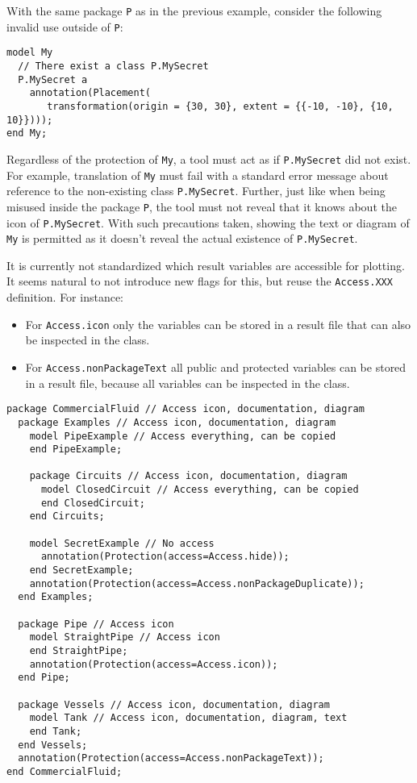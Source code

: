 \begin{example}
With the same package \lstinline!P! as in the previous example, consider the following invalid use outside of \lstinline!P!:
\begin{lstlisting}[language=modelica]
model My
  // There exist a class P.MySecret
  P.MySecret a
    annotation(Placement(
       transformation(origin = {30, 30}, extent = {{-10, -10}, {10, 10}})));
end My;
\end{lstlisting}
Regardless of the protection of \lstinline!My!, a tool must act as if \lstinline!P.MySecret! did not exist.
For example, translation of \lstinline!My! must fail with a standard error message about reference to the non-existing class \lstinline!P.MySecret!.
Further, just like when being misused inside the package \lstinline!P!, the tool must not reveal that it knows about the icon of \lstinline!P.MySecret!.
With such precautions taken, showing the text or diagram of \lstinline!My! is permitted as it doesn't reveal the actual existence of \lstinline!P.MySecret!.
\end{example}

\begin{nonnormative}
It is currently not standardized which result variables are accessible for plotting.
It seems natural to not introduce new flags for this, but reuse the \lstinline!Access.XXX! definition.
For instance:
\begin{itemize}
\item For \lstinline!Access.icon! only the variables can be stored in a result file that can also be inspected in the class.
\item For \lstinline!Access.nonPackageText! all public and protected variables can be stored in a result file, because all variables can be inspected in the class.
\end{itemize}

\begin{lstlisting}[language=modelica]
package CommercialFluid // Access icon, documentation, diagram
  package Examples // Access icon, documentation, diagram
    model PipeExample // Access everything, can be copied
    end PipeExample;

    package Circuits // Access icon, documentation, diagram
      model ClosedCircuit // Access everything, can be copied
      end ClosedCircuit;
    end Circuits;

    model SecretExample // No access
      annotation(Protection(access=Access.hide));
    end SecretExample;
    annotation(Protection(access=Access.nonPackageDuplicate));
  end Examples;

  package Pipe // Access icon
    model StraightPipe // Access icon
    end StraightPipe;
    annotation(Protection(access=Access.icon));
  end Pipe;

  package Vessels // Access icon, documentation, diagram
    model Tank // Access icon, documentation, diagram, text
    end Tank;
  end Vessels;
  annotation(Protection(access=Access.nonPackageText));
end CommercialFluid;
\end{lstlisting}
\end{nonnormative}

